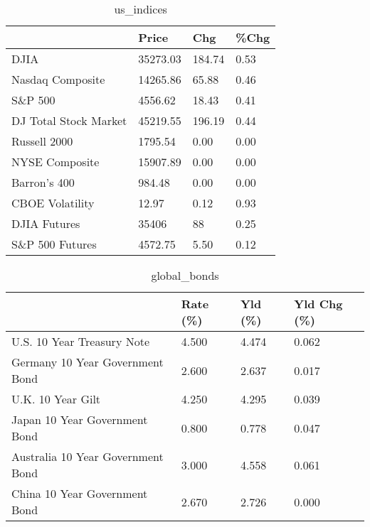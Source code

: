 \documentclass{article}%
\begin{document}
%


\begin{table}[htbp]%
\caption{us\_indices}%
\centering%
\begin{adjustbox}{width=1\textwidth}%
\begin{tabular}{llll}
\toprule
                      &    Price &    Chg & \%Chg \\
\midrule
                 DJIA & 35273.03 & 184.74 & 0.53 \\
     Nasdaq Composite & 14265.86 &  65.88 & 0.46 \\
              S\&P 500 &  4556.62 &  18.43 & 0.41 \\
DJ Total Stock Market & 45219.55 & 196.19 & 0.44 \\
         Russell 2000 &  1795.54 &   0.00 & 0.00 \\
       NYSE Composite & 15907.89 &   0.00 & 0.00 \\
         Barron's 400 &   984.48 &   0.00 & 0.00 \\
      CBOE Volatility &    12.97 &   0.12 & 0.93 \\
         DJIA Futures &    35406 &     88 & 0.25 \\
      S\&P 500 Futures &  4572.75 &   5.50 & 0.12 \\
\bottomrule
\end{tabular}
%
\end{adjustbox}%
\end{table}

%


\begin{table}[htbp]%
\caption{global\_bonds}%
\centering%
\begin{adjustbox}{width=1\textwidth}%
\begin{tabular}{llll}
\toprule
                                  & Rate (\%) & Yld (\%) & Yld Chg (\%) \\
\midrule
       U.S. 10 Year Treasury Note &    4.500 &   4.474 &       0.062 \\
  Germany 10 Year Government Bond &    2.600 &   2.637 &       0.017 \\
                U.K. 10 Year Gilt &    4.250 &   4.295 &       0.039 \\
    Japan 10 Year Government Bond &    0.800 &   0.778 &       0.047 \\
Australia 10 Year Government Bond &    3.000 &   4.558 &       0.061 \\
    China 10 Year Government Bond &    2.670 &   2.726 &       0.000 \\
\bottomrule
\end{tabular}
%
\end{adjustbox}%
\end{table}
\end{document}
